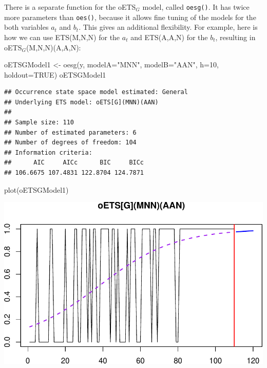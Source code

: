 \documentclass[
]{book}
\newenvironment{Shaded}{\begin{snugshade}}{\end{snugshade}}
\newcommand{\AttributeTok}[1]{\textcolor[rgb]{0.77,0.63,0.00}{#1}}
\newcommand{\ConstantTok}[1]{\textcolor[rgb]{0.00,0.00,0.00}{#1}}
\newcommand{\DecValTok}[1]{\textcolor[rgb]{0.00,0.00,0.81}{#1}}
\newcommand{\FunctionTok}[1]{\textcolor[rgb]{0.00,0.00,0.00}{#1}}
\newcommand{\NormalTok}[1]{#1}
\newcommand{\OtherTok}[1]{\textcolor[rgb]{0.56,0.35,0.01}{#1}}
\newcommand{\StringTok}[1]{\textcolor[rgb]{0.31,0.60,0.02}{#1}}
\theoremstyle{definition}
\theoremstyle{definition}
\theoremstyle{definition}
\theoremstyle{definition}
\theoremstyle{remark}
\begin{document}
There is a separate function for the oETS\(_G\) model, called \texttt{oesg()}. It has twice more parameters than \texttt{oes()}, because it allows fine tuning of the models for the both variables \(a_t\) and \(b_t\). This gives an additional flexibility. For example, here is how we can use ETS(M,N,N) for the \(a_t\) and ETS(A,A,N) for the \(b_t\), resulting in oETS\(_G\)(M,N,N)(A,A,N):

\begin{Shaded}
\begin{Highlighting}[]
\NormalTok{oETSGModel1 }\OtherTok{\textless{}{-}} \FunctionTok{oesg}\NormalTok{(y, }\AttributeTok{modelA=}\StringTok{"MNN"}\NormalTok{, }\AttributeTok{modelB=}\StringTok{"AAN"}\NormalTok{,}
                    \AttributeTok{h=}\DecValTok{10}\NormalTok{, }\AttributeTok{holdout=}\ConstantTok{TRUE}\NormalTok{)}
\NormalTok{oETSGModel1}
\end{Highlighting}
\end{Shaded}

\begin{verbatim}
## Occurrence state space model estimated: General
## Underlying ETS model: oETS[G](MNN)(AAN)
## 
## Sample size: 110
## Number of estimated parameters: 6
## Number of degrees of freedom: 104
## Information criteria: 
##      AIC     AICc      BIC     BICc 
## 106.6675 107.4831 122.8704 124.7871
\end{verbatim}

\begin{Shaded}
\begin{Highlighting}[]
\FunctionTok{plot}\NormalTok{(oETSGModel1)}
\end{Highlighting}
\end{Shaded}

\includegraphics{adam_files/figure-latex/oETSGExample1-1.pdf}
\end{document}
